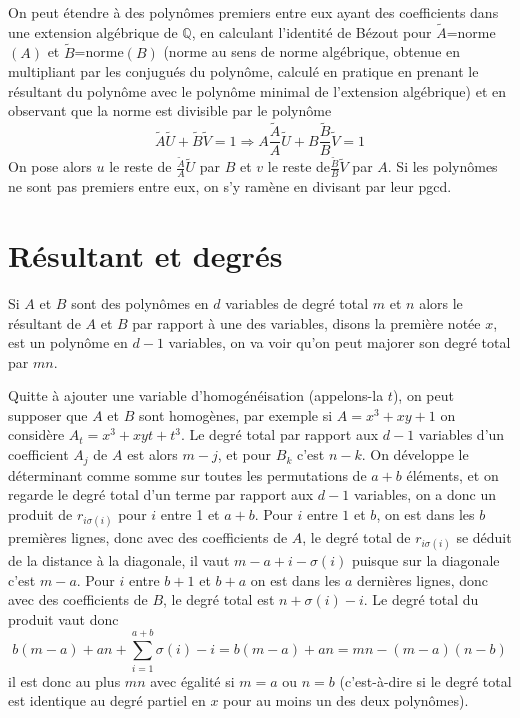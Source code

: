 \documentclass[a4paper,11pt]{book}
\begin{document}
\begin{giacjshere}
On peut \'etendre \`a des polyn\^omes premiers entre eux ayant des coefficients
dans une extension alg\'ebrique de $\mathbb{Q}$, en calculant l'identit\'e
de B\'ezout pour $\tilde{A}$=norme$(A)$ et 
$\tilde{B}$=norme$(B)$ (norme au sens de norme
alg\'ebrique, obtenue en multipliant par les conjugu\'es du
polyn\^ome, calcul\'e en pratique en prenant le r\'esultant
du polyn\^ome avec le polyn\^ome minimal de l'extension
alg\'ebrique) et en observant que
la norme est divisible par le polyn\^ome
$$ \tilde{A} \tilde{U}+\tilde{B}\tilde{V}=1
\Rightarrow A \frac{\tilde{A}}{A} \tilde{U}+ 
B \frac{\tilde{B}}{B}\tilde{V}=1$$
On pose alors $u$ le reste de $ \frac{\tilde{A}}{A} \tilde{U}$ par $B$
et $v$ le reste de$ \frac{\tilde{B}}{B}\tilde{V}$ par $A$.
Si les polyn\^omes ne sont pas premiers entre eux, on s'y ram\`ene
en divisant par leur pgcd.

\section{R\'esultant et degr\'es}
Si $A$ et $B$ sont des polyn\^omes en $d$ variables de degr\'e
total $m$ et $n$ alors le r\'esultant de $A$ et $B$ par rapport \`a
une des variables, disons la premi\`ere not\'ee $x$,
 est un polyn\^ome en $d-1$ variables, on va voir qu'on peut
majorer son degr\'e total par $mn$.

Quitte \`a ajouter une variable d'homog\'en\'eisation (appelons-la $t$), on peut
supposer que $A$ et $B$ sont homog\`enes, par exemple
si $A=x^3+xy+1$ on consid\`ere $A_t=x^3+xyt+t^3$. Le degr\'e total 
par rapport aux $d-1$ variables d'un
coefficient $A_j$ de $A$ est alors $m-j$, et pour $B_k$ c'est $n-k$.
On d\'eveloppe le d\'eterminant comme somme sur toutes les
permutations de $a+b$ \'el\'ements, et on regarde le degr\'e
total d'un terme par rapport aux $d-1$ variables, on a donc
un produit de $r_{i \sigma(i)}$ pour $i$ entre 1 et $a+b$. Pour $i$
entre $1$ et $b$, on est dans les $b$ premi\`eres lignes, donc
avec des coefficients de $A$, le degr\'e total de $r_{i \sigma(i)}$
se d\'eduit de la distance \`a la diagonale, il vaut
$m-a+i-\sigma(i)$ puisque sur la diagonale c'est $m-a$.
Pour $i$ entre $b+1$ et $b+a$ on est dans les $a$ derni\`eres
lignes, donc avec des coefficients de $B$, le degr\'e total est
$n+\sigma(i)-i$. Le degr\'e total du produit vaut donc
$$ b(m-a)+an+\sum_{i=1}^{a+b} \sigma(i) -i = b(m-a)+an=mn-(m-a)(n-b)$$
il est donc au plus $mn$ avec \'egalit\'e si $m=a$ ou $n=b$
(c'est-\`a-dire si le degr\'e total est identique au degr\'e partiel
en $x$ pour au moins un des deux polyn\^omes).


\end{giacjshere}
\end{document}
